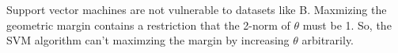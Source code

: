 \begin{answer}
Support vector machines are not vulnerable to datasets like B. Maxmizing the geometric margin contains a restriction that the 2-norm of $\theta$ must be 1. So, the SVM algorithm can't maximzing the margin by increasing $\theta$ arbitrarily.
\end{answer}
